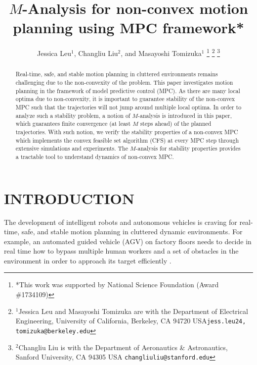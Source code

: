 \documentclass[letterpaper, 10 pt, conference]{ieeeconf}  %
\title{\LARGE \bf
$M$-Analysis for non-convex motion planning using MPC framework*
}
\author{ Jessica Leu$^{1}$, Changliu Liu$^{2}$,  and Masayoshi Tomizuka$^{1}$%
\thanks{*This work was supported by National Science Foundation (Award \#1734109)}%
\thanks{$^{1}$Jessica Leu and Masayoshi Tomizuka are with the Department of Electrical Engineering, University of California,
Berkeley, CA 94720 USA{\tt\small jess.leu24, tomizuka@berkeley.edu}}%
\thanks{$^{2}$Changliu Liu is with the Department of Aeronautics \& Astronautics, Sanford University, CA 94305 USA
        {\tt\small changliuliu@stanford.edu}}%
}
\begin{document}
\maketitle
\thispagestyle{empty}
\pagestyle{empty}


\begin{abstract}

Real-time, safe, and stable motion planning in cluttered environments remains challenging due to the non-convexity of the problem. This paper investigates motion planning in the framework of model predictive control (MPC). As there are many local optima due to non-convexity, it is important to guarantee stability of the non-convex MPC such that the trajectories will not jump around multiple local optima. In order to analyze such a stability problem, a notion of $M$-analysis is introduced in this paper, which guarantees finite convergence (at least $M$ steps ahead) of the planned trajectories. With such notion, we verify the stability properties of a non-convex MPC which implements the convex feasible set algorithm (CFS) at every MPC step through extensive simulations and experiments. The $M$-analysis for stability properties provides a tractable tool to understand dynamics of non-convex MPC.
\end{abstract}


\section{INTRODUCTION}

The development of intelligent robots and autonomous vehicles is craving for real-time, safe, and stable motion planning in cluttered dynamic environments. For example, an automated guided vehicle (AGV) on factory floors \cite{wu2004modeling} needs to decide in real time how to bypass multiple human workers and a set of obstacles in the environment in order to approach its target efficiently \cite{wang2009autonomous,oleari2014industrial}. 
\end{document}
